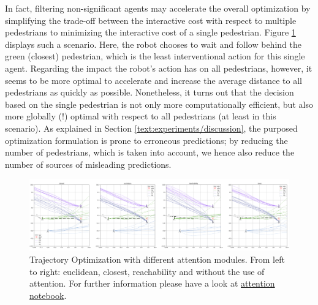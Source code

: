 In fact, filtering non-significant agents may accelerate the overall optimization by simplifying the trade-off between the interactive cost with respect to multiple pedestrians to minimizing the interactive cost of a single pedestrian. Figure \ref{img:attention} displays such a scenario. Here, the robot chooses to wait and follow behind the green (closest) pedestrian, which is the least interventional action for this single agent. Regarding the impact the robot's action has on all pedestrians, however, it seems to be more optimal to accelerate and increase the average distance to all pedestrians as quickly as possible. Nonetheless, it turns out that the decision based on the single pedestrian is not only more computationally efficient, but also more globally (!) optimal with respect to all pedestrians (at least in this scenario). As explained in Section \ref{text:experiments/discussion}, the purposed optimization formulation is prone to erroneous predictions; by reducing the number of pedestrians, which is taken into account, we hence also reduce the number of sources of misleading predictions.

\begin{figure}[!ht]
\begin{center}
\includegraphics[width=\textwidth]{images/attention.png}
\end{center}
\caption{Trajectory Optimization with different attention modules. From left to right: euclidean, closest, reachability and without the use of attention. For further information please have a look at \href{https://github.com/simon-schaefer/mantrap/blob/master/examples/attention.ipynb}{attention notebook}.}
\label{img:attention}
\end{figure}
